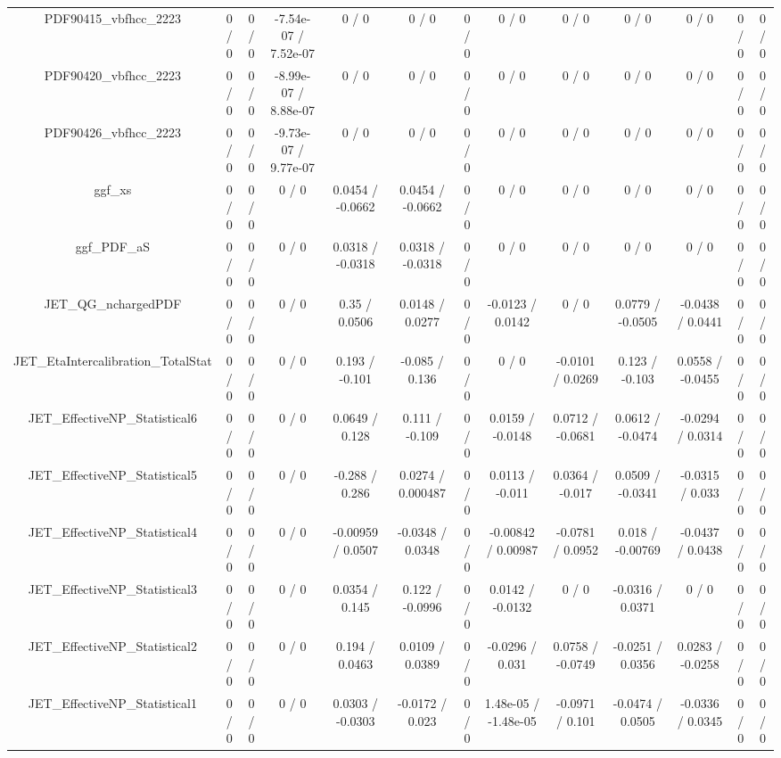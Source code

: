 \documentclass[10pt]{article}
\begin{document}
\begin{table}[htbp]
\begin{center}
\begin{tabular}{|c|c|c|c|c|c|c|c|c|c|c|c|c|}
  PDF90415_vbfhcc_2223 & 0 / 0 & 0 / 0 & -7.54e-07 / 7.52e-07 & 0 / 0 & 0 / 0 & 0 / 0 & 0 / 0 & 0 / 0 & 0 / 0 & 0 / 0 & 0 / 0 & 0 / 0 \\ 
  PDF90420_vbfhcc_2223 & 0 / 0 & 0 / 0 & -8.99e-07 / 8.88e-07 & 0 / 0 & 0 / 0 & 0 / 0 & 0 / 0 & 0 / 0 & 0 / 0 & 0 / 0 & 0 / 0 & 0 / 0 \\ 
  PDF90426_vbfhcc_2223 & 0 / 0 & 0 / 0 & -9.73e-07 / 9.77e-07 & 0 / 0 & 0 / 0 & 0 / 0 & 0 / 0 & 0 / 0 & 0 / 0 & 0 / 0 & 0 / 0 & 0 / 0 \\ 
  ggf_xs & 0 / 0 & 0 / 0 & 0 / 0 & 0.0454 / -0.0662 & 0.0454 / -0.0662 & 0 / 0 & 0 / 0 & 0 / 0 & 0 / 0 & 0 / 0 & 0 / 0 & 0 / 0 \\ 
  ggf_PDF_aS & 0 / 0 & 0 / 0 & 0 / 0 & 0.0318 / -0.0318 & 0.0318 / -0.0318 & 0 / 0 & 0 / 0 & 0 / 0 & 0 / 0 & 0 / 0 & 0 / 0 & 0 / 0 \\ 
  JET_QG_nchargedPDF & 0 / 0 & 0 / 0 & 0 / 0 & 0.35 / 0.0506 & 0.0148 / 0.0277 & 0 / 0 & -0.0123 / 0.0142 & 0 / 0 & 0.0779 / -0.0505 & -0.0438 / 0.0441 & 0 / 0 & 0 / 0 \\ 
  JET_EtaIntercalibration_TotalStat & 0 / 0 & 0 / 0 & 0 / 0 & 0.193 / -0.101 & -0.085 / 0.136 & 0 / 0 & 0 / 0 & -0.0101 / 0.0269 & 0.123 / -0.103 & 0.0558 / -0.0455 & 0 / 0 & 0 / 0 \\ 
  JET_EffectiveNP_Statistical6 & 0 / 0 & 0 / 0 & 0 / 0 & 0.0649 / 0.128 & 0.111 / -0.109 & 0 / 0 & 0.0159 / -0.0148 & 0.0712 / -0.0681 & 0.0612 / -0.0474 & -0.0294 / 0.0314 & 0 / 0 & 0 / 0 \\ 
  JET_EffectiveNP_Statistical5 & 0 / 0 & 0 / 0 & 0 / 0 & -0.288 / 0.286 & 0.0274 / 0.000487 & 0 / 0 & 0.0113 / -0.011 & 0.0364 / -0.017 & 0.0509 / -0.0341 & -0.0315 / 0.033 & 0 / 0 & 0 / 0 \\ 
  JET_EffectiveNP_Statistical4 & 0 / 0 & 0 / 0 & 0 / 0 & -0.00959 / 0.0507 & -0.0348 / 0.0348 & 0 / 0 & -0.00842 / 0.00987 & -0.0781 / 0.0952 & 0.018 / -0.00769 & -0.0437 / 0.0438 & 0 / 0 & 0 / 0 \\ 
  JET_EffectiveNP_Statistical3 & 0 / 0 & 0 / 0 & 0 / 0 & 0.0354 / 0.145 & 0.122 / -0.0996 & 0 / 0 & 0.0142 / -0.0132 & 0 / 0 & -0.0316 / 0.0371 & 0 / 0 & 0 / 0 & 0 / 0 \\ 
  JET_EffectiveNP_Statistical2 & 0 / 0 & 0 / 0 & 0 / 0 & 0.194 / 0.0463 & 0.0109 / 0.0389 & 0 / 0 & -0.0296 / 0.031 & 0.0758 / -0.0749 & -0.0251 / 0.0356 & 0.0283 / -0.0258 & 0 / 0 & 0 / 0 \\ 
  JET_EffectiveNP_Statistical1 & 0 / 0 & 0 / 0 & 0 / 0 & 0.0303 / -0.0303 & -0.0172 / 0.023 & 0 / 0 & 1.48e-05 / -1.48e-05 & -0.0971 / 0.101 & -0.0474 / 0.0505 & -0.0336 / 0.0345 & 0 / 0 & 0 / 0 \\ 

\end{tabular}
\end{center}
\end{table}
\end{document}
